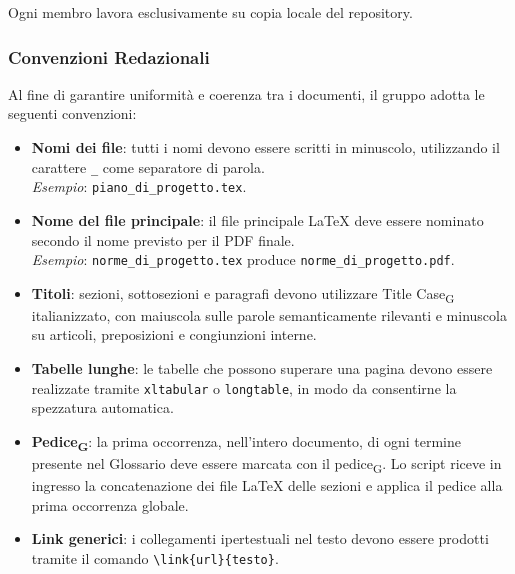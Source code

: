 Ogni membro lavora esclusivamente su copia locale del repository.


\subsubsection{Convenzioni Redazionali}
\label{sec:convenzioni}

Al fine di garantire uniformità e coerenza tra i documenti, il gruppo adotta le
seguenti convenzioni:

\begin{itemize}
    \item \textbf{Nomi dei file}: tutti i nomi devono essere scritti in minuscolo,
    utilizzando il carattere \texttt{\_} come separatore di parola.
    \\
    \textit{Esempio}: \texttt{piano\_di\_progetto.tex}.

    \item \textbf{Nome del file principale}: il file principale \LaTeX{} deve essere
    nominato secondo il nome previsto per il PDF finale.
    \\
    \textit{Esempio}: \texttt{norme\_di\_progetto.tex} produce
    \texttt{norme\_di\_progetto.pdf}.

    \item \textbf{Titoli}: sezioni, sottosezioni e paragrafi devono utilizzare
    Title Case\textsubscript{G} italianizzato, con maiuscola sulle parole semanticamente
    rilevanti e minuscola su articoli, preposizioni e congiunzioni interne.

    \item \textbf{Tabelle lunghe}: le tabelle che possono superare una pagina devono
    essere realizzate tramite \texttt{xltabular} o \texttt{longtable}, in modo da
    consentirne la spezzatura automatica.

    \item \textbf{Pedice\textsubscript{G}}: la prima occorrenza, nell'intero documento, di ogni
    termine presente nel Glossario deve essere marcata con il pedice\textsubscript{G}. Lo script riceve in ingresso la concatenazione dei file
    \LaTeX{} delle sezioni e applica il pedice alla prima occorrenza globale.

    \item \textbf{Link generici}: i collegamenti ipertestuali nel testo devono essere
    prodotti tramite il comando \verb|\link{url}{testo}|.


\end{itemize}
